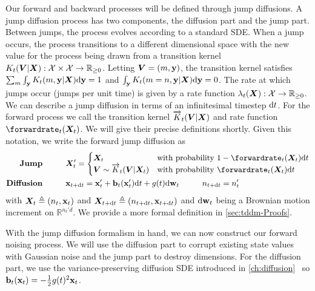 Our forward and backward processes will be defined through jump diffusions. A jump diffusion process has two components, the diffusion part and the jump part. Between jumps, the process evolves according to a standard SDE. When a jump occurs, the process transitions to a different dimensional space with the new value for the process being drawn from a transition kernel $K_t({\bm{V}} | {\bm{X}}): {\mathcal{X}} \times {\mathcal{X}} \rightarrow  \mathbb{R}_{\geq 0}$. Letting ${\bm{V}} = (m, {\mathbf{y}})$, the transition kernel satisfies $\sum_m \int_{\mathbf{y}} K_t(m, {\mathbf{y}} | {\bm{X}}) \mathrm{d} {\mathbf{y}} = 1$ and $\int_{\mathbf{y}} K_t(m=n, {\mathbf{y}} | {\bm{X}}) \mathrm{d} {\mathbf{y}} = 0$. The rate at which jumps occur (jumps per unit time) is given by a rate function $\lambda_t({\bm{X}}): \mathcal{X} \rightarrow \mathbb{R}_{\geq 0}$. 
We can describe a jump diffusion in terms of an infinitesimal timestep $\mathrm{d} t$. For the forward process we call the transition kernel $\overrightarrow{K}_t({\bm{V}}|{\bm{X}})$ and rate function $\forwardrate_t(\mX_t)$. We will give their precise definitions shortly. Given this notation, we write the forward jump diffusion as
\begin{align}
    \textbf{Jump} \hspace{1cm} & \mX_t' = \begin{cases}
        \mX_t & \text{with probability } 1 - \forwardrate_t(\mX_t) \rmd t \\
        \mV \sim \ftk_t( \mV |\mX_t) & \text{with probability } \forwardrate_t(\mX_t) \rmd t
    \end{cases}  \label{eq:tddm-forward-jump} \\
    \textbf{Diffusion} \hspace{1cm} &\rvx_{t+ \rmd t} = \rvx'_t + \rvb_t(\rvx'_t) \rmd t + g(t) \rmd \brown_t \hspace{1cm} n_{t+\rmd t} = n_t'
     \label{eq:tddm-forward-diffusion}
\end{align}
with ${\bm{X}}_t \triangleq (n_t, {\mathbf{x}}_t)$ and ${\bm{X}}_{t+\mathrm{d} t} \triangleq (n_{t+\mathrm{d} t}, {\mathbf{x}}_{t + \mathrm{d} t})$ and $\mathrm{d} \mathbf{w}_t$ being a Brownian motion increment on $\mathbb{R}^{n_t'd}$. We provide a more formal definition in \cref{sec:tddm-Proofs}.

With the jump diffusion formalism in hand, we can now construct our forward noising process. We will use the diffusion part to corrupt existing state values with Gaussian noise and the jump part to destroy dimensions. For the diffusion part, we use the variance-preserving diffusion SDE introduced in \cref{ch:diffusion}~\cite{ho2020denoising, song2020score} so ${\mathbf{b}}_t({\mathbf{x}}_t) = -\frac{1}{2}g(t)^2 {\mathbf{x}}_t$.

